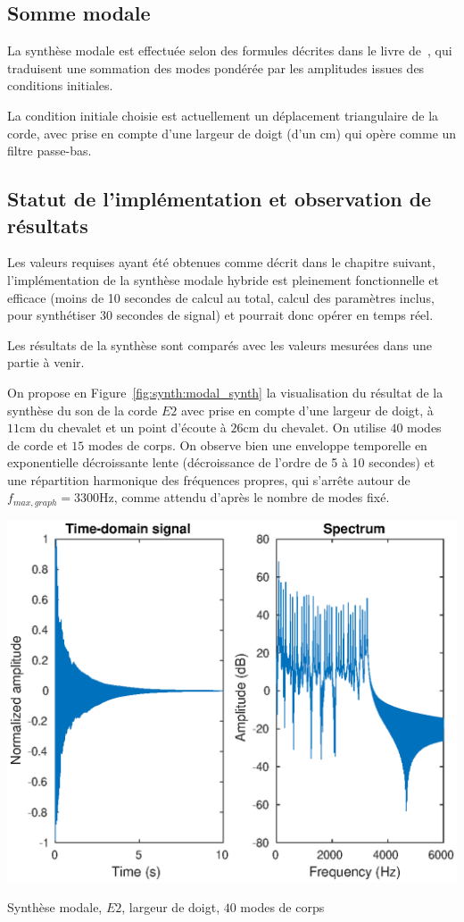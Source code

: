 \subsection{Somme modale}

  La synthèse modale est effectuée selon des formules décrites
dans le livre de~\textcite{newland}, qui traduisent une sommation des modes
pondérée par les amplitudes issues des conditions initiales.

  La condition initiale choisie est actuellement un déplacement triangulaire
de la corde, avec prise en compte d'une largeur de doigt (d'un \( \si{\cm} \))
qui opère comme un filtre passe-bas.

\subsection{Statut de l'implémentation et observation de résultats}

Les valeurs requises ayant été obtenues comme décrit dans le chapitre suivant,
l'implémentation de la synthèse modale hybride est pleinement fonctionnelle
et efficace (moins de 10 secondes de calcul au total, calcul des paramètres
inclus, pour synthétiser 30 secondes de signal) et pourrait donc opérer en
temps réel.

Les résultats de la synthèse sont comparés avec les valeurs mesurées dans une
partie à venir.

On propose en Figure~\ref{fig:synth:modal_synth} la visualisation du résultat
de la synthèse du son de la corde \( E2 \) avec prise en compte d'une largeur
de doigt, à \( \si{11\cm} \) du chevalet et un point d'écoute à
\( \si{26\cm} \) du chevalet.
On utilise \( 40 \) modes de corde et \( 15 \) modes de corps.
On observe bien une enveloppe temporelle en exponentielle décroissante lente
(décroissance de l'ordre de 5 à 10 secondes) et une répartition harmonique
des fréquences propres, qui s'arrête autour de
\( f_{max, graph} = \si{3300\Hz} \), comme attendu d'après le nombre de modes
fixé.

\begin{table}[hpbt]
\centering
\includegraphics[scale=0.6]{figures/modal_synthesis-E2-40_string_modes-15_body_modes-finger_pluck.eps}
 \caption{Synthèse modale, \( E2 \), largeur de doigt, \( 40 \) modes de corps
 \label{fig:synth:modal_synth}}
\end{table}

% 

